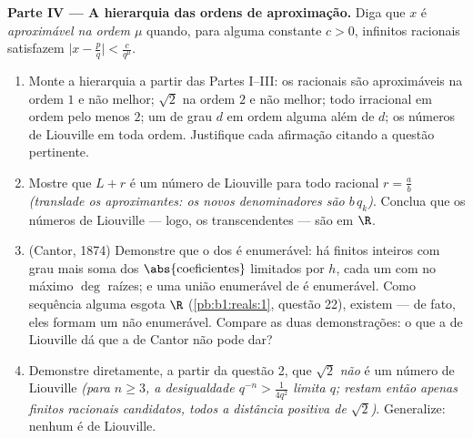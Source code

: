 \begin{problem}
\medskip
\noindent\textbf{Parte IV --- A hierarquia das ordens de
aproximação.} Diga que $x$ é \emph{aproximável na ordem $\mu$} quando,
para alguma constante $c > 0$, infinitos racionais satisfazem
$\bigl|x - \frac pq\bigr| < \frac{c}{q^{\mu}}$.
\begin{enumerate}
  \item Monte a hierarquia a partir das Partes I--III: os racionais são
        aproximáveis na ordem $1$ e não melhor; $\sqrt 2$ na
        ordem $2$ e não melhor; todo irracional em ordem pelo
        menos $2$; um  de grau $d$ em ordem alguma
        além de $d$; os números de Liouville em toda ordem. Justifique
        cada afirmação citando a questão pertinente.
  \item Mostre que $L + r$ é um número de Liouville para todo
        racional $r = \frac ab$ \emph{(translade os
        aproximantes: os novos denominadores são $b\,q_k$)}.
        Conclua que os números de Liouville --- logo, os
        transcendentes --- são  em $\R$.
  \item (Cantor, 1874) Demonstre que o  dos 
        é enumerável: há finitos 
        inteiros com grau mais soma dos $\abs{\text{coeficientes}}$
        limitados por $h$, cada um com no máximo $\deg$ raízes; e uma
        união enumerável de  é enumerável. Como
        sequência alguma esgota $\R$ (\cref{pb:b1:reals:1}, questão
        22), existem  --- de fato, eles formam um
         não enumerável. Compare as duas demonstrações: o que a
        de Liouville dá que a de Cantor não pode dar?
  \item Demonstre diretamente, a partir da questão 2, que $\sqrt 2$
        \emph{não} é um número de Liouville \emph{(para $n \geq 3$,
        a desigualdade $q^{-n} > \frac{1}{4q^2}$ limita $q$;
        restam então apenas finitos racionais candidatos, todos
        a distância positiva de $\sqrt2$)}. Generalize:
        nenhum  é de Liouville.
\end{enumerate}


\end{problem}
